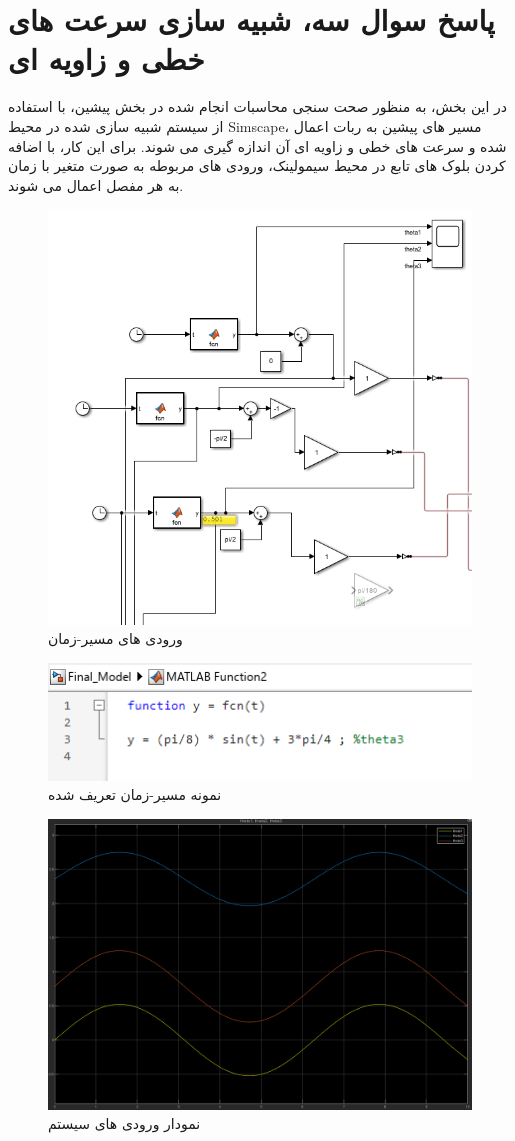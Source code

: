 \section*{پاسخ سوال سه، شبیه سازی سرعت های خطی و زاویه ای}
در این بخش، به منظور صحت سنجی محاسبات انجام شده در بخش پیشین، با استفاده از سیستم شبیه سازی شده در محیط Simscape، مسیر های پیشین به ربات اعمال شده و سرعت های خطی و زاویه ای آن اندازه گیری می شوند.
برای این کار، با اضافه کردن بلوک های تابع در محیط سیمولینک، ورودی های مربوطه به صورت متغیر با زمان به هر مفصل اعمال می شوند. 
\begin{figure}[htbp]
	\centering
	\includegraphics[width=0.6\linewidth]{../img/input}
	\caption{ورودی های مسیر-زمان}
	\label{fig:input}
\end{figure}
\begin{figure}[htbp]
	\centering
	\includegraphics[width=0.7\linewidth]{../img/input_matlab_function_example}
	\caption{نمونه مسیر-زمان تعریف شده}
	\label{fig:inputmatlabfunctionexample}
\end{figure}
\begin{figure}[htbp]
	\centering
	\includegraphics[width=0.7\linewidth]{../img/input_scop}
	\caption{نمودار ورودی های سیستم}
	\label{fig:inputscop}
\end{figure}
